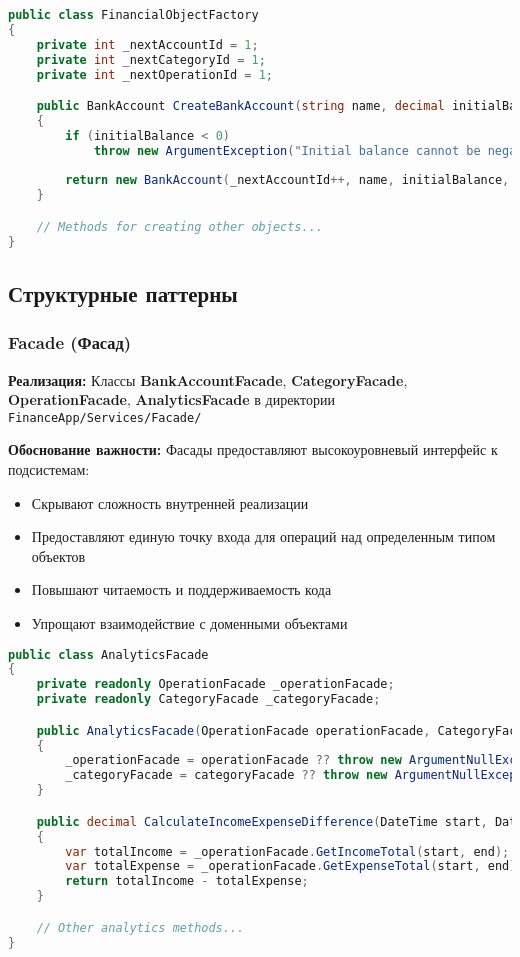 \documentclass[12pt,a4paper]{article}
\begin{document}
\begin{lstlisting}[language=csharp]
public class FinancialObjectFactory
{
    private int _nextAccountId = 1;
    private int _nextCategoryId = 1;
    private int _nextOperationId = 1;

    public BankAccount CreateBankAccount(string name, decimal initialBalance, AccountType type = AccountType.Checking)
    {
        if (initialBalance < 0)
            throw new ArgumentException("Initial balance cannot be negative", nameof(initialBalance));
        
        return new BankAccount(_nextAccountId++, name, initialBalance, type);
    }

    // Methods for creating other objects...
}
\end{lstlisting}

\subsection{Структурные паттерны}

\subsubsection{Facade (Фасад)}

\textbf{Реализация:} Классы \textbf{BankAccountFacade}, \textbf{CategoryFacade}, \textbf{OperationFacade}, \textbf{AnalyticsFacade} в директории \texttt{FinanceApp/Services/Facade/}

\textbf{Обоснование важности:} Фасады предоставляют высокоуровневый интерфейс к подсистемам:
\begin{itemize}
    \item Скрывают сложность внутренней реализации
    \item Предоставляют единую точку входа для операций над определенным типом объектов
    \item Повышают читаемость и поддерживаемость кода
    \item Упрощают взаимодействие с доменными объектами
\end{itemize}

\begin{lstlisting}[language=csharp]
public class AnalyticsFacade
{
    private readonly OperationFacade _operationFacade;
    private readonly CategoryFacade _categoryFacade;

    public AnalyticsFacade(OperationFacade operationFacade, CategoryFacade categoryFacade)
    {
        _operationFacade = operationFacade ?? throw new ArgumentNullException(nameof(operationFacade));
        _categoryFacade = categoryFacade ?? throw new ArgumentNullException(nameof(categoryFacade));
    }

    public decimal CalculateIncomeExpenseDifference(DateTime start, DateTime end)
    {
        var totalIncome = _operationFacade.GetIncomeTotal(start, end);
        var totalExpense = _operationFacade.GetExpenseTotal(start, end);
        return totalIncome - totalExpense;
    }

    // Other analytics methods...
}
\end{lstlisting}
\end{document}
